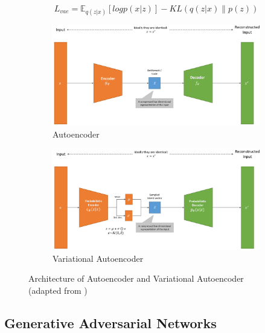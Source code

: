 \begin{equation}
    \label{eqn:vae_loss}
    L_{vae} =\mathbb{E}_{q(z|x)}[logp(x|z)]-KL(q(z|x) \parallel p(z))
\end{equation}


\begin{figure}[H]
  \centering
  \begin{subfigure}{0.8\textwidth}
    \includegraphics[width=\linewidth]{images/ae.png}
    \caption{Autoencoder} \label{fig:ae}
  \end{subfigure}
  \vspace{\baselineskip}   %
  \begin{subfigure}{0.8\textwidth}
    \includegraphics[width=\linewidth]{images/vae.png}
    \caption{Variational Autoencoder} \label{fig:vae}
  \end{subfigure}
\captionsetup{justification=centering}
\caption[Autoencoders]{Architecture of Autoencoder and Variational Autoencoder \\(adapted from \cite{weng2018AutoencoderBetaVAE})} \label{fig:vae_overview}
\end{figure}


\newpage %
\subsection{Generative Adversarial Networks}
\label{ch:preliminaries-generativeAdversarialNetworks}

